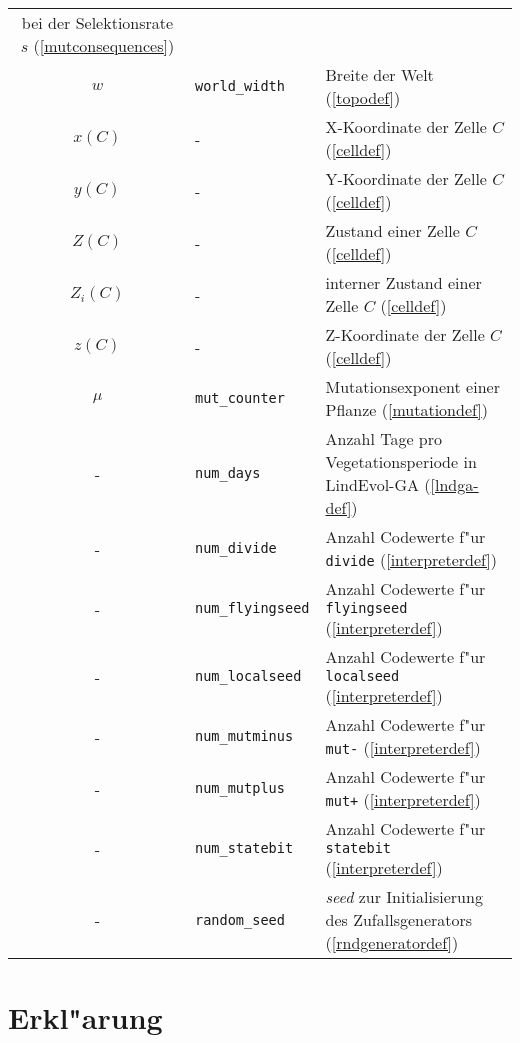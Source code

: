 \begin{appendix}
\begin{tabularx}{\linewidth}{|c|l|X|}
                                          bei der Selektionsrate $s$ (\ref{mutconsequences}) \\
$w$          & \verb|world_width|       & Breite der Welt (\ref{topodef}) \\
$x(C)$       & -                        & X-Koordinate der Zelle $C$ (\ref{celldef}) \\
$y(C)$       & -                        & Y-Koordinate der Zelle $C$ (\ref{celldef}) \\
$Z(C)$       & -                        & Zustand einer Zelle $C$ (\ref{celldef}) \\
$Z_i(C)$     & -                        & interner Zustand einer Zelle $C$ (\ref{celldef}) \\
$z(C)$       & -                        & Z-Koordinate der Zelle $C$ (\ref{celldef}) \\
$\mu$        & \verb|mut_counter|       & Mutationsexponent einer Pflanze (\ref{mutationdef}) \\
-            & \verb|num_days|          & Anzahl Tage pro Vegetationsperiode in LindEvol-GA (\ref{lndga-def}) \\
-            & \verb|num_divide|        & Anzahl Codewerte f"ur \verb|divide| (\ref{interpreterdef}) \\
-            & \verb|num_flyingseed|    & Anzahl Codewerte f"ur \verb|flyingseed| (\ref{interpreterdef}) \\
-            & \verb|num_localseed|     & Anzahl Codewerte f"ur \verb|localseed| (\ref{interpreterdef}) \\
-            & \verb|num_mutminus|      & Anzahl Codewerte f"ur \verb|mut-| (\ref{interpreterdef}) \\
-            & \verb|num_mutplus|       & Anzahl Codewerte f"ur \verb|mut+| (\ref{interpreterdef}) \\
-            & \verb|num_statebit|      & Anzahl Codewerte f"ur \verb|statebit| (\ref{interpreterdef}) \\
-            & \verb|random_seed|       & {\slshape seed} zur Initialisierung des Zufallsgenerators (\ref{rndgeneratordef}) \\ \hline
\end{tabularx}



\chapter{Erkl"arung}


\end{appendix}
